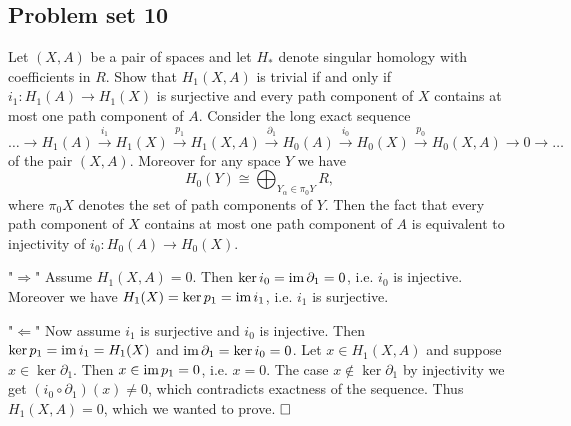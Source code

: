 \documentclass[11pt]{book}
\numberwithin{dummy}{section}
\theoremstyle{nonumberbreak}
\newenvironment{sol}[1][]{\ifthenelse{\equal{#1}{}}{\solution}{\solution[#1]}\rm}{\endsolution}
\newenvironment{prob}[1][]{\ifthenelse{\equal{#1}{}}{\problem}{\problem[#1]}\rm}{\endproblem}
\newcommand{\im}{\mathrm{im} \hspace{1.5pt}}
\newcommand{\la}{\longrightarrow}
\begin{document}
\begin{spacing}{1.4}
\begin{prob}
\begin{sol}
\end{sol}

\end{prob}




















\newpage 


\titlespacing*{\section}{-16.5pt}{0pt}{20pt}
\renewcommand*\thesection{}
\section{Problem set 10} %
\renewcommand*\thesection{\arabic{section}}




\begin{prob}    %
Let $(X,A)$ be a pair of spaces and let $H_*$ denote singular homology with coefficients in $R$. Show that $H_1(X,A)$ is trivial if and only if $i_1: H_1(A) \la H_1(X)$ is surjective and every path component of $X$ contains at most one path component of $A$.
\begin{sol}
Consider the long exact sequence
$$\ldots \la H_1(A) \overset{i_1}{\la} H_1(X) \overset{p_1}{\la} H_1(X,A) \overset{\partial_1}{\la} H_{0}(A) \overset{i_0}{\la} H_{0}(X) \overset{p_0}{\la} H_0(X,A) \la 0 \la \ldots$$
 of the pair $(X,A)$. Moreover for any space $Y$ we have 
 $$H_0(Y) \cong \bigoplus_{Y_{\alpha} \in \pi_0Y} R,$$
 where $\pi_0X$ denotes the set of path components of $Y$. Then the fact that every path component of $X$ contains at most one path component of $A$ is equivalent to injectivity of $i_0: H_0(A) \la H_0(X)$.
\begin{compactenum}
\item["$\Rightarrow$"] Assume $H_1(X,A)=0$. Then $\ker i_0 = \im \partial_1 = 0$, i.e. $i_0$ is injective. Moreover we have $H_1(X) = \ker p_1 = \im i_1$, i.e. $i_1$ is surjective.
\item["$\Leftarrow$"] Now assume $i_1$ is surjective and $i_0$ is injective. Then $\ker p_1 = \im i_1 = H_1(X)$ and $\im \partial_1 = \ker i_0 = 0$. Let $x\in H_1(X,A)$ and suppose $x \in \ker \partial_1$. Then $x \in \im p_1=0$, i.e. $x=0$. The case $x \notin \ker \partial_1$ by injectivity we get $(i_0 \circ \partial_1)(x) \neq 0$, which contradicts exactness of the sequence. Thus $H_1(X,A)=0$, which we wanted to prove. $\hfill\Box$
\end{compactenum}



\end{sol}
\end{prob}
\end{spacing}
\end{document}
